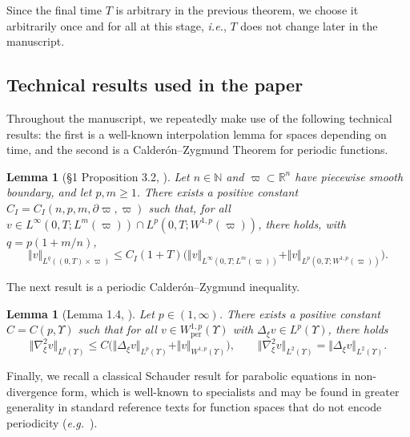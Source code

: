 \documentclass[11pt,a4paper,reqno]{amsart}
\newtheorem{lemma}[prop]{Lemma}
\theoremstyle{remark}
\theoremstyle{definition}
\numberwithin{equation}{section}
\newcommand{\per}{\mathrm{per}}
\newcommand{\bxi}{\xi}
\begin{document}
Since the final time $T$ is arbitrary in the previous theorem, we choose it arbitrarily once and for all at this stage, \textit{i.e.}, $T$ does not change later in the manuscript. 



\subsection{Technical results used in the paper}

Throughout the manuscript, we repeatedly make use of the following technical results: the first is a well-known interpolation lemma for spaces depending on time,  and the second is a Calder\'on--Zygmund Theorem for periodic functions.




\begin{lemma}[\S 1 Proposition 3.2, \cite{DiBenedetto}]\label{lem:dibenedetto classic}
    Let $n \in \mathbb{N}$ and $\varpi \subset \mathbb{R}^n$ have piecewise smooth boundary, and let $p,m \geq 1$. There exists a positive constant $C_I=C_I(n,p,m,\partial\varpi,\varpi)$ such that, for all $v \in L^\infty(0,T;L^m(\varpi)) \cap L^p(0,T;W^{1,p}(\varpi))$, there holds, with $q = p(1+m/n)$, 
    \begin{equation*}
        \Vert v \Vert_{L^q((0,T)\times\varpi)} \leq C_I ( 1 + {T}) \Big( \Vert v \Vert_{L^\infty(0,T;L^m(\varpi))} + \Vert v \Vert_{L^p(0,T;W^{1,p}(\varpi))} \Big). 
    \end{equation*}
\end{lemma}




The next result is a periodic Calder\'on--Zygmund inequality.


\begin{lemma}[Lemma 1.4, \cite{reg1}]\label{lem:CZ periodic}
   Let $p \in (1,\infty)$. There exists a positive constant $C=C(p,\Upsilon)$ such that for all $v \in W^{1,p}_\per(\Upsilon)$ with $\Delta_{\bxi} v \in L^p(\Upsilon)$, there holds 
    \begin{equation*}
        \Vert \nabla^2_{\bxi} v \Vert_{L^p(\Upsilon)} \leq C\Big( \Vert \Delta_{\bxi} v \Vert_{L^p(\Upsilon)} + \Vert v \Vert_{W^{1,p}(\Upsilon)} \Big), \qquad \Vert \nabla^2_{\bxi} v \Vert_{L^2(\Upsilon)} = \Vert \Delta_{\bxi} v \Vert_{L^2(\Upsilon)}. 
    \end{equation*}
\end{lemma}


Finally, we recall a classical Schauder result for parabolic equations in non-divergence form, which is well-known to specialists and may be found in greater generality in standard reference texts for function spaces that do not encode periodicity (\textit{e.g.}~\cite[Ch.7, \S 6]{lieberman}). 
\end{document}
